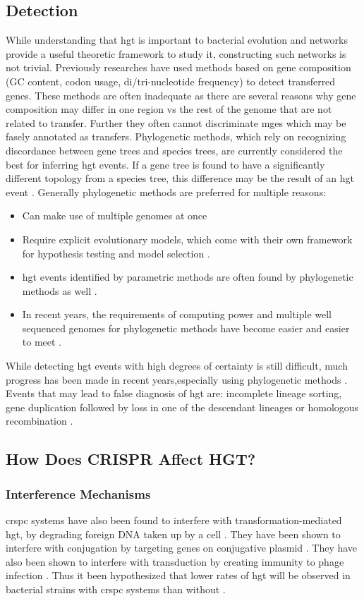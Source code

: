 \subsection{Detection}
While understanding that \ac{hgt} is important to bacterial evolution and networks provide a useful theoretic framework to study it, constructing such networks is not trivial.
Previously researches have used methods based on gene composition (GC content, codon usage, di/tri-nucleotide frequency) to detect transferred genes.
These methods are often inadequate as there are several reasons why gene composition may differ in one region vs the rest of the genome that are not related to transfer.
Further they often cannot discriminate \ac{mge}s which may be fasely annotated as transfers.
Phylogenetic methods, which rely on recognizing discordance between gene trees and species trees, are currently considered the best for inferring \ac{hgt} events.
If a gene tree is found to have a significantly different topology from a species tree, this difference may be the result of an \ac{hgt} event \citep{hgterr}.
Generally phylogenetic methods are preferred for multiple reasons:
\begin{itemize}
    \item Can make use of multiple genomes at once \citep{ihgt}
    \item Require explicit evolutionary models, which come with their own framework for hypothesis testing and model selection \citep{ihgt}.
    \item \ac{hgt} events identified by parametric methods are often found by phylogenetic methods as well \citep{ihgt}.
    \item In recent years, the requirements of computing power and  multiple well sequenced genomes for phylogenetic methods have become easier and easier to meet \citep{ihgt}.
\end{itemize}
While detecting \ac{hgt} events with high degrees of certainty is still difficult, much progress has been made in recent years,especially using phylogenetic methods \citep{ihgt}.
Events that may lead to false diagnosis of \ac{hgt} are: incomplete lineage sorting, gene duplication followed by loss in one of the descendant lineages or homologous recombination \citep{ihgt,hgterr}.

\subsection{How Does CRISPR Affect HGT?}
\subsubsection{Interference Mechanisms}
\ac{crspc} systems have also been found to interfere with transformation-mediated \ac{hgt}, by degrading foreign DNA taken up by a cell \citep{climtrans}.
They have been shown to interfere with conjugation by targeting genes on conjugative plasmid \citep{staphlim}.
They have also been shown to interfere with transduction by creating immunity to phage infection \citep{staphlim}.
Thus it been hypothesized that lower rates of \ac{hgt} will be observed in bacterial strains with \ac{crspc} systems than without \citep{staphlim}.
